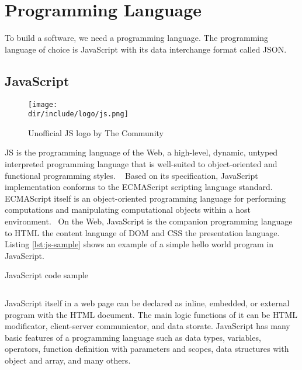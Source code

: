 \section{Programming Language}
\label{sec:programming}

To build a software, we need a programming language.
The programming language of choice is JavaScript with its data interchange format called JSON.

\subsection{JavaScript}

\begin{wrapfigure}{r}{0.5\textwidth}
  \vspace{-20pt}
  \begin{center}
    \texttt{[image: \\dir/include/logo/js.png]}
  \end{center}
  \vspace{-20pt}
  \caption{Unofficial JS logo by The Community}
  \label{fig:js-logo}
  \vspace{-10pt}
\end{wrapfigure}

\ac{JS} is the programming language of the Web, a high-level, dynamic, untyped interpreted programming language that is well-suited to object-oriented and functional programming styles.
~\autocite{Flanagan:2011:JS}
Based on its specification, JavaScript implementation conforms to the ECMAScript\textsuperscript{\textregistered} scripting language standard.
ECMAScript itself is an object-oriented programming language for performing computations and manipulating computational objects within a host environment.~\autocite{ECMA:2011:ECMAScript}
On the Web, JavaScript is the companion programming language to \ac{HTML} the content language of \ac{DOM} and \ac{CSS} the presentation language.
Listing \autoref{lst:js-sample} shows an example of a simple hello world program in JavaScript.

\begin{listing}[htbp]
\caption{JavaScript code sample}
\inputminted{javascript}{\dir/include/js-sample.js}
\label{lst:js-sample}
\end{listing}

JavaScript itself in a web page can be declared as inline, embedded, or external program with the \ac{HTML} document.
The main logic functions of it can be \ac{HTML} modificator, client-server communicator, and data storate.
JavaScript has many basic features of a programming language such as data types, variables, operators, function definition with parameters and scopes, data structures with object and array, and many others.

